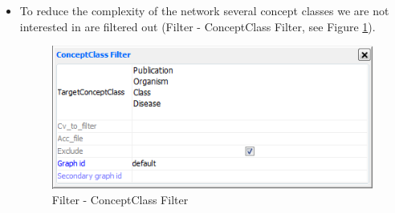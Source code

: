 \begin{itemize}
\item To reduce the complexity of the network several concept classes we are not interested in are filtered out
(Filter - ConceptClass Filter, see Figure \ref{fig:integrator_cc}).
\begin{figure}[H]
\centering
\includegraphics[scale=0.6]{images/Oct12/cc.png} 
\caption{Filter - ConceptClass Filter}
\label{fig:integrator_cc}
\end{figure}


\end{itemize}
